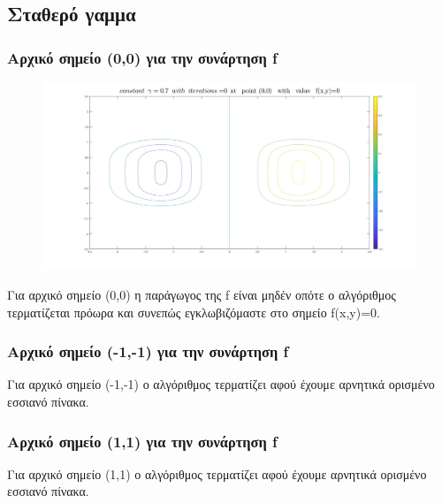 \documentclass{article}
\begin{document}
\subsection*{Σταθερό γαμμα}
\subsubsection*{Αρχικό σημείο (0,0) για την συνάρτηση f}
\begin{figure}[h!]	
     \centering  
     \advance\leftskip-0.2cm  
  \includegraphics[width=140mm,scale=2]{n1aa.jpg}
\end{figure} 
Για αρχικό σημείο (0,0) η παράγωγος της f είναι μηδέν οπότε ο αλγόριθμος τερματίζεται πρόωρα και συνεπώς εγκλωβιζόμαστε στο σημείο f(x,y)=0.
\subsubsection*{Αρχικό σημείο (-1,-1) για την συνάρτηση f}

Για αρχικό σημείο (-1,-1) ο αλγόριθμος τερματίζει αφού έχουμε αρνητικά ορισμένο εσσιανό πίνακα.
\clearpage
\subsubsection*{Αρχικό σημείο (1,1) για την συνάρτηση f}
 
Για αρχικό σημείο (1,1) ο αλγόριθμος τερματίζει αφού έχουμε αρνητικά ορισμένο εσσιανό πίνακα.
\end{document}
